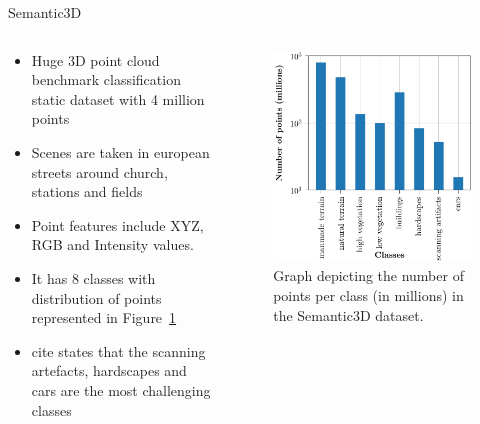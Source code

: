 \documentclass[aspectratio=169]{beamer}
\begin{document}
\begin{frame}{Semantic3D}
    \begin{columns}
        \begin{column}{0.5\textwidth}
            \begin{itemize}
                \item Huge 3D point cloud benchmark classification static dataset with 4 million points
                \item Scenes are taken in european streets around church, stations and fields
                \item Point features include XYZ, RGB and Intensity values.
                \item It has 8 classes with distribution of points represented in Figure~\ref{fig:sem3d_stats}
                \item cite states that the scanning artefacts, hardscapes and cars are the most challenging classes
            \end{itemize}
        \end{column}
        \begin{column}{0.5\textwidth}
            \begin{figure}
                \centering
                \includegraphics[scale=0.22]{images/sem3d/sem3d_stats.jpg}
                \caption{Graph depicting the number of points per class (in millions) in the Semantic3D dataset.}
                \label{fig:sem3d_stats}
            \end{figure}
        \end{column}
    \end{columns}
\end{frame}
\end{document}
